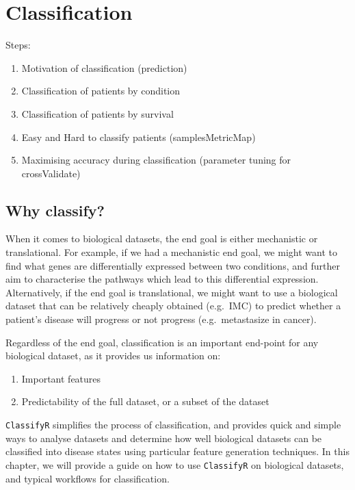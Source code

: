 \documentclass[
  letterpaper,
  DIV=11,
  numbers=noendperiod]{scrreprt}
\providecommand{\tightlist}{%
  \setlength{\itemsep}{0pt}\setlength{\parskip}{0pt}}\usepackage{longtable,booktabs,array}
\begin{document}

\chapter{Classification}\label{classification}

Steps:

\begin{enumerate}
\def\labelenumi{\arabic{enumi}.}
\tightlist
\item
  Motivation of classification (prediction)
\item
  Classification of patients by condition
\item
  Classification of patients by survival
\item
  Easy and Hard to classify patients (samplesMetricMap)
\item
  Maximising accuracy during classification (parameter tuning for
  crossValidate)
\end{enumerate}

\section{Why classify?}\label{why-classify}

When it comes to biological datasets, the end goal is either mechanistic
or translational. For example, if we had a mechanistic end goal, we
might want to find what genes are differentially expressed between two
conditions, and further aim to characterise the pathways which lead to
this differential expression. Alternatively, if the end goal is
translational, we might want to use a biological dataset that can be
relatively cheaply obtained (e.g.~IMC) to predict whether a patient's
disease will progress or not progress (e.g.~metastasize in cancer).

Regardless of the end goal, classification is an important end-point for
any biological dataset, as it provides us information on:

\begin{enumerate}
\def\labelenumi{\arabic{enumi}.}
\tightlist
\item
  Important features
\item
  Predictability of the full dataset, or a subset of the dataset
\end{enumerate}

\texttt{ClassifyR} simplifies the process of classification, and
provides quick and simple ways to analyse datasets and determine how
well biological datasets can be classified into disease states using
particular feature generation techniques. In this chapter, we will
provide a guide on how to use \texttt{ClassifyR} on biological datasets,
and typical workflows for classification.
\end{document}
